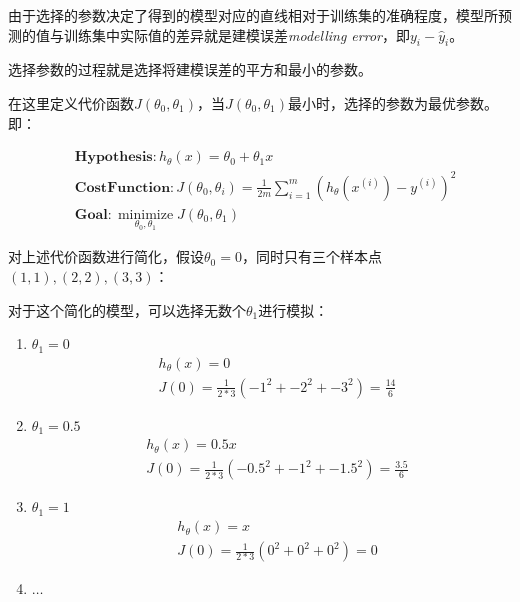 \documentclass[12pt, a4paper]{article}
\begin{document}
            由于选择的参数决定了得到的模型对应的直线相对于训练集的准确程度，模型所预测的值与训练集中实际值的差异就是建模误差\textit{modelling error}，即$y_i - \hat{y}_i$。

            选择参数的过程就是选择将建模误差的平方和最小的参数。
            
            在这里定义代价函数$J(\theta_0, \theta_1)$，当$J(\theta_0, \theta_1)$最小时，选择的参数为最优参数。即：

            \begin{align*}
                &\mathbf{Hypothesis}: h_\theta(x)=\theta_0 + \theta_1x \\
                &\mathbf{Cost Function}: J(\theta_0, \theta_i) = \frac{1}{2m}\sum_{i=1}^{m}(h_\theta(x^{(i)})-y^{(i)})^2 \\
                &\mathbf{Goal}: \mathop{minimize}\limits_{\theta_0, \theta_1}J(\theta_0, \theta_1)
            \end{align*}

            对上述代价函数进行简化，假设$\theta_0=0$，同时只有三个样本点$(1,1),(2,2),(3,3)$：

            对于这个简化的模型，可以选择无数个$\theta_1$进行模拟：
            
            \begin{enumerate}
                \item $\theta_1=0$
                \begin{align*}
                    &h_\theta(x) = 0 \\
                    &J(0) = \frac{1}{2*3}(-1^2+-2^2+-3^2) = \frac{14}{6}
                \end{align*}
                \item $\theta_1=0.5$
                \begin{align*}
                    &h_\theta(x) = 0.5x \\
                    &J(0) = \frac{1}{2*3}(-0.5^2+-1^2+-1.5^2) = \frac{3.5}{6}
                \end{align*}
                \item $\theta_1=1$
                \begin{align*}
                    &h_\theta(x) = x \\
                    &J(0) = \frac{1}{2*3}(0^2+0^2+0^2) = 0
                \end{align*}
                \item $\dots$
            \end{enumerate}
\end{document}
